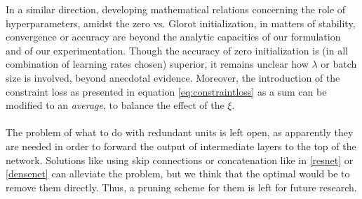 In a similar direction, developing mathematical relations concerning the role of hyperparameters, amidst the zero vs. Glorot initialization, in matters of stability, convergence or accuracy are beyond the analytic capacities of our formulation and of our experimentation. Though the accuracy of zero initialization is (in all combination of learning rates chosen) superior, it remains unclear how $\lambda$ or batch size is involved, beyond anecdotal evidence. Moreover, the introduction of the constraint loss as presented in equation \ref{eq:constraintloss} as a sum can be modified to an \emph{average}, to balance the effect of the $\xi$.      
\\\\
The problem of what to do with redundant units is left open, as apparently they are needed in order to forward the output of intermediate layers to the top of the network. Solutions like using skip connections or concatenation like in \ref{resnet} or \ref{densenet} can alleviate the problem, but we think that the optimal would be to remove them directly. Thus, a pruning scheme for them is left for future research.
  